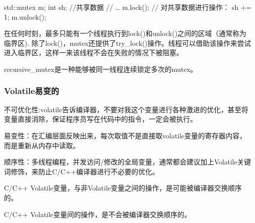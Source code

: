 \begin{Code}
	std::mutex  m;
	int sh; //共享数据
	// …
	m.lock();
	// 对共享数据进行操作：
	sh += 1;
	m.unlock();
\end{Code}
在任何时刻，最多只能有一个线程执行到lock()和unlock()之间的区域（通常称为临界区). 除了lock()，mutex还提供了try_lock()操作。线程可以借助该操作来尝试进入临界区，这样一来该线程不会在失败的情况下被阻塞。

recursive_mutex是一种能够被同一线程连续锁定多次的mutex。

\subsubsection{Volatile易变的}
不可优化性:volatile告诉编译器，不要对我这个变量进行各种激进的优化，甚至将变量直接消除，保证程序员写在代码中的指令，一定会被执行。

易变性：在汇编层面反映出来，每次取值不是直接取volatile变量的寄存器内容，而是重新从内存中读取。

顺序性：多线程编程，并发访问/修改的全局变量，通常都会建议加上Volatile关键词修饰，来防止C/C++编译器进行不必要的优化。

C/C++ Volatile变量，与非Volatile变量之间的操作，是可能被编译器交换顺序的。

C/C++ Volatile变量间的操作，是不会被编译器交换顺序的。